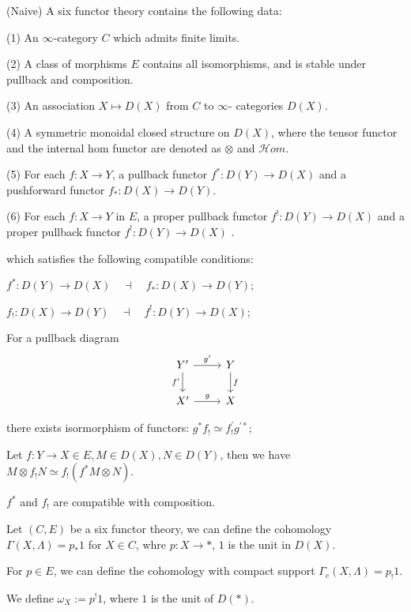 \begin{definition}(Naive)
    A six functor theory contains the following data:

(1) An $\infty$-category $C$ which admits finite limits.

(2) A class of morphisms $E$ contains all isomorphisms, and is stable under pullback and composition.

(3) An association $X \mapsto D(X)$ from $C$ to $\infty$- categories $D(X)$.

(4) A symmetric monoidal closed structure on $D(X)$, where the tensor functor and the internal hom functor are denoted as $\otimes$ and $\mathcal{H}om$.

(5) For each $f: X \rightarrow Y$, a pullback functor $f^*: D(Y) \rightarrow D(X)$ and a pushforward functor $f_*: D(X) \rightarrow D(Y)$.

(6) For each $f: X \rightarrow Y$ in $E$, a proper pullback functor $f^{!}: D(Y) \rightarrow D(X)$ and  a proper pullback functor $f^{!}: D(Y) \rightarrow D(X)$ .

which satisfies the following compatible conditions:



$f^*: D(Y) \rightarrow D(X) \quad \dashv \quad f_*: D(X) \rightarrow D(Y)$;

$f_{!}: D(X) \rightarrow D(Y) \quad \dashv \quad f^!: D(Y) \rightarrow D(X)$;

For a pullback diagram \[
\begin{tikzcd}
Y' \ar[r,"g'"] \ar[d,"f'"'] & Y \ar[d,"f"] \\
X' \ar[r,"g"] & X
\end{tikzcd}
\] 

there exists isormorphism of functors: $g^* f_{!} \simeq f_{!}^{\prime} g^{\prime *}$;

Let $f:Y\to X\in E, M\in D(X),N\in D(Y)$, then we have $M \otimes f_{!} N \simeq f_{!}\left(f^* M \otimes N\right)$.

$f^*$ and $f_!$ are compatible with composition.

\begin{definition}
    Let $(C,E)$ be a six functor theory, we can define the cohomology $\Gamma(X,\Lambda)=p_* 1$ for $X\in C$, whre $p:X \to *$, $1$ is the unit in $D(X)$.

    For $p \in E$, we can define the cohomology with compact support $\Gamma_c(X,\Lambda)=p_!1$.

    We define $\omega_X:=p^!1$, where $1$ is the unit of $D(*)$.
\end{definition}


\end{definition}
